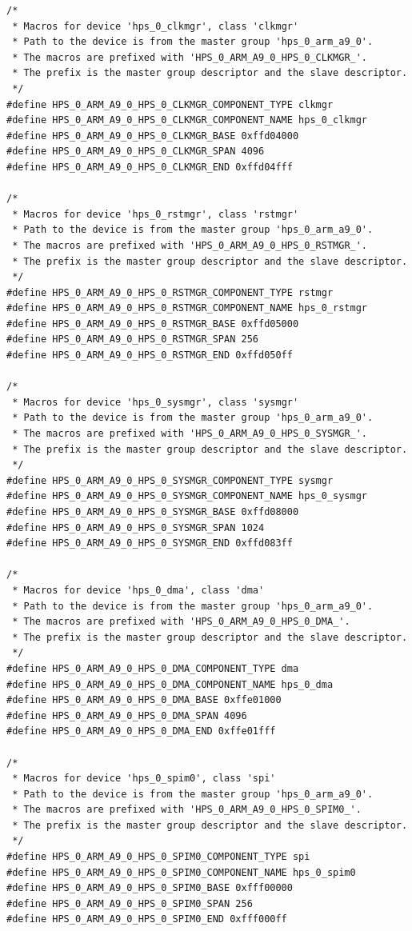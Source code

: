 \documentclass[conference]{IEEEtran}
\begin{document}
\begin{lstlisting}
/*
 * Macros for device 'hps_0_clkmgr', class 'clkmgr'
 * Path to the device is from the master group 'hps_0_arm_a9_0'.
 * The macros are prefixed with 'HPS_0_ARM_A9_0_HPS_0_CLKMGR_'.
 * The prefix is the master group descriptor and the slave descriptor.
 */
#define HPS_0_ARM_A9_0_HPS_0_CLKMGR_COMPONENT_TYPE clkmgr
#define HPS_0_ARM_A9_0_HPS_0_CLKMGR_COMPONENT_NAME hps_0_clkmgr
#define HPS_0_ARM_A9_0_HPS_0_CLKMGR_BASE 0xffd04000
#define HPS_0_ARM_A9_0_HPS_0_CLKMGR_SPAN 4096
#define HPS_0_ARM_A9_0_HPS_0_CLKMGR_END 0xffd04fff

/*
 * Macros for device 'hps_0_rstmgr', class 'rstmgr'
 * Path to the device is from the master group 'hps_0_arm_a9_0'.
 * The macros are prefixed with 'HPS_0_ARM_A9_0_HPS_0_RSTMGR_'.
 * The prefix is the master group descriptor and the slave descriptor.
 */
#define HPS_0_ARM_A9_0_HPS_0_RSTMGR_COMPONENT_TYPE rstmgr
#define HPS_0_ARM_A9_0_HPS_0_RSTMGR_COMPONENT_NAME hps_0_rstmgr
#define HPS_0_ARM_A9_0_HPS_0_RSTMGR_BASE 0xffd05000
#define HPS_0_ARM_A9_0_HPS_0_RSTMGR_SPAN 256
#define HPS_0_ARM_A9_0_HPS_0_RSTMGR_END 0xffd050ff

/*
 * Macros for device 'hps_0_sysmgr', class 'sysmgr'
 * Path to the device is from the master group 'hps_0_arm_a9_0'.
 * The macros are prefixed with 'HPS_0_ARM_A9_0_HPS_0_SYSMGR_'.
 * The prefix is the master group descriptor and the slave descriptor.
 */
#define HPS_0_ARM_A9_0_HPS_0_SYSMGR_COMPONENT_TYPE sysmgr
#define HPS_0_ARM_A9_0_HPS_0_SYSMGR_COMPONENT_NAME hps_0_sysmgr
#define HPS_0_ARM_A9_0_HPS_0_SYSMGR_BASE 0xffd08000
#define HPS_0_ARM_A9_0_HPS_0_SYSMGR_SPAN 1024
#define HPS_0_ARM_A9_0_HPS_0_SYSMGR_END 0xffd083ff

/*
 * Macros for device 'hps_0_dma', class 'dma'
 * Path to the device is from the master group 'hps_0_arm_a9_0'.
 * The macros are prefixed with 'HPS_0_ARM_A9_0_HPS_0_DMA_'.
 * The prefix is the master group descriptor and the slave descriptor.
 */
#define HPS_0_ARM_A9_0_HPS_0_DMA_COMPONENT_TYPE dma
#define HPS_0_ARM_A9_0_HPS_0_DMA_COMPONENT_NAME hps_0_dma
#define HPS_0_ARM_A9_0_HPS_0_DMA_BASE 0xffe01000
#define HPS_0_ARM_A9_0_HPS_0_DMA_SPAN 4096
#define HPS_0_ARM_A9_0_HPS_0_DMA_END 0xffe01fff

/*
 * Macros for device 'hps_0_spim0', class 'spi'
 * Path to the device is from the master group 'hps_0_arm_a9_0'.
 * The macros are prefixed with 'HPS_0_ARM_A9_0_HPS_0_SPIM0_'.
 * The prefix is the master group descriptor and the slave descriptor.
 */
#define HPS_0_ARM_A9_0_HPS_0_SPIM0_COMPONENT_TYPE spi
#define HPS_0_ARM_A9_0_HPS_0_SPIM0_COMPONENT_NAME hps_0_spim0
#define HPS_0_ARM_A9_0_HPS_0_SPIM0_BASE 0xfff00000
#define HPS_0_ARM_A9_0_HPS_0_SPIM0_SPAN 256
#define HPS_0_ARM_A9_0_HPS_0_SPIM0_END 0xfff000ff


\end{lstlisting}
\end{document}
